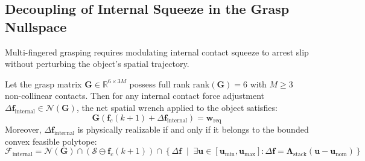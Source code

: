 \subsection{Decoupling of Internal Squeeze in the Grasp Nullspace}
Multi-fingered grasping requires modulating internal contact squeeze to arrest slip without perturbing the object's spatial trajectory.

\begin{theorem}
\label{thm:nullspace}
Let the grasp matrix $\mathbf{G} \in \mathbb{R}^{6 \times 3M}$ possess full rank $\text{rank}(\mathbf{G}) = 6$ with $M \ge 3$ non-collinear contacts. Then for any internal contact force adjustment $\Delta \mathbf{f}_{\text{internal}} \in \mathcal{N}(\mathbf{G})$, the net spatial wrench applied to the object satisfies:
\begin{equation}
    \mathbf{G} \left( \mathbf{f}_c(k+1) + \Delta \mathbf{f}_{\text{internal}} \right) = \mathbf{w}_{\text{req}}
\end{equation}
Moreover, $\Delta \mathbf{f}_{\text{internal}}$ is physically realizable if and only if it belongs to the bounded convex feasible polytope:
\begin{equation}
    \mathcal{F}_{\text{internal}} = \mathcal{N}(\mathbf{G}) \cap \left( \mathcal{S} \ominus \mathbf{f}_c(k+1) \right) \cap \left\{ \Delta \mathbf{f} \;\middle|\; \exists \mathbf{u} \in [\mathbf{u}_{\min}, \mathbf{u}_{\max}]: \Delta \mathbf{f} = \mathbf{\Lambda}_{\text{stack}} (\mathbf{u} - \mathbf{u}_{\text{nom}}) \right\}
    \label{eq:feasible_internal_polytope}
\end{equation}
\end{theorem}

